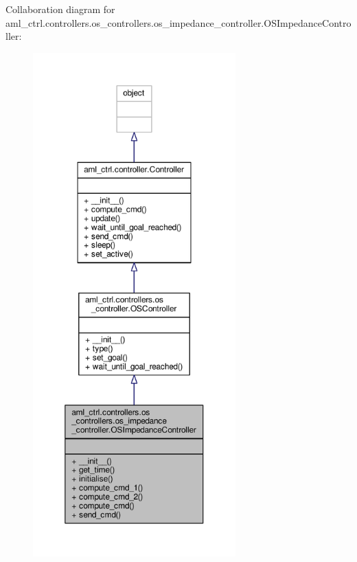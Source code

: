 Collaboration diagram for aml\-\_\-ctrl.\-controllers.\-os\-\_\-controllers.\-os\-\_\-impedance\-\_\-controller.\-O\-S\-Impedance\-Controller\-:\nopagebreak
\begin{figure}[H]
\begin{center}
\leavevmode
\includegraphics[height=550pt]{classaml__ctrl_1_1controllers_1_1os__controllers_1_1os__impedance__controller_1_1_o_s_impedance_controller__coll__graph}
\end{center}
\end{figure}
